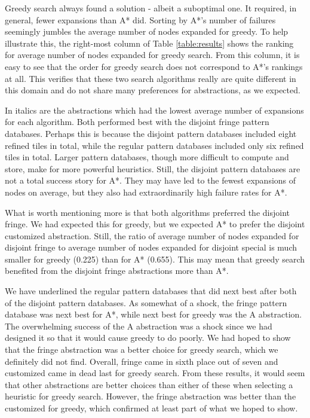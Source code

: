 \documentclass[letterpaper]{article}
\begin{document}
Greedy search always found a solution - albeit a suboptimal one. It required, in general, fewer expansions than A* did.  Sorting by A*'s number of failures seemingly jumbles the average number of nodes expanded for greedy.  To help illustrate this, the right-most column of Table \ref{table:results} shows the ranking for average number of nodes expanded for greedy search.  From this column, it is easy to see that the order for greedy search does not correspond to A*'s rankings at all.  This verifies that these two search algorithms really are quite different in this domain and do not share many preferences for abstractions, as we expected.

In italics are the abstractions which had the lowest average number of expansions for each algorithm.  Both performed best with the disjoint fringe pattern databases.  Perhaps this is because the disjoint pattern databases included eight refined tiles in total, while the regular pattern databases included only six refined tiles in total.  Larger pattern databases, though more difficult to compute and store, make for more powerful heuristics.  Still, the disjoint pattern databases are not a total success story for A*.  They may have led to the fewest expansions of nodes on average, but they also had extraordinarily high failure rates for A*.

What is worth mentioning more is that both algorithms preferred the disjoint fringe.  We had expected this for greedy, but we expected A* to prefer the disjoint customized abstraction.  Still, the ratio of average number of nodes expanded for disjoint fringe to average number of nodes expanded for disjoint special is much smaller for greedy (0.225) than for A* (0.655).  This may mean that greedy search benefited from the disjoint fringe abstractions more than A*.

We have underlined the regular pattern databases that did next best after both of the disjoint pattern databases.  As somewhat of a shock, the fringe pattern database was next best for A*, while next best for greedy was the A abstraction.  The overwhelming success of the A abstraction was a shock since we had designed it so that it would cause greedy to do poorly.  We had hoped to show that the fringe abstraction was a better choice for greedy search, which we definitely did not find.  Overall, fringe came in sixth place out of seven and customized came in dead last for greedy search.  From these results, it would seem that other abstractions are better choices than either of these when selecting a heuristic for greedy search.  However, the fringe abstraction was better than the customized for greedy, which confirmed at least part of what we hoped to show.  
\end{document}
